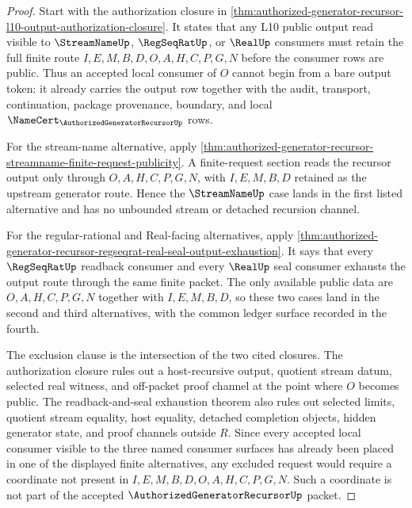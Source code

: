 \begin{proof}
Start with the authorization closure in \autoref{thm:authorized-generator-recursor-l10-output-authorization-closure}. It states that any L10 public output read visible to $\StreamNameUp$, $\RegSeqRatUp$, or $\RealUp$ consumers must retain the full finite route $I,E,M,B,D,O,A,H,C,P,G,N$ before the consumer rows are public. Thus an accepted local consumer of $O$ cannot begin from a bare output token: it already carries the output row together with the audit, transport, continuation, package provenance, boundary, and local $\NameCert_{\AuthorizedGeneratorRecursorUp}$ rows.

For the stream-name alternative, apply \autoref{thm:authorized-generator-recursor-streamname-finite-request-publicity}. A finite-request section reads the recursor output only through $O,A,H,C,P,G,N$, with $I,E,M,B,D$ retained as the upstream generator route. Hence the $\StreamNameUp$ case lands in the first listed alternative and has no unbounded stream or detached recursion channel.

For the regular-rational and Real-facing alternatives, apply \autoref{thm:authorized-generator-recursor-regseqrat-real-seal-output-exhaustion}. It says that every $\RegSeqRatUp$ readback consumer and every $\RealUp$ seal consumer exhausts the output route through the same finite packet. The only available public data are $O,A,H,C,P,G,N$ together with $I,E,M,B,D$, so these two cases land in the second and third alternatives, with the common ledger surface recorded in the fourth.

The exclusion clause is the intersection of the two cited closures. The authorization closure rules out a host-recursive output, quotient stream datum, selected real witness, and off-packet proof channel at the point where $O$ becomes public. The readback-and-seal exhaustion theorem also rules out selected limits, quotient stream equality, host equality, detached completion objects, hidden generator state, and proof channels outside $R$. Since every accepted local consumer visible to the three named consumer surfaces has already been placed in one of the displayed finite alternatives, any excluded request would require a coordinate not present in $I,E,M,B,D,O,A,H,C,P,G,N$. Such a coordinate is not part of the accepted $\AuthorizedGeneratorRecursorUp$ packet.
\end{proof}
